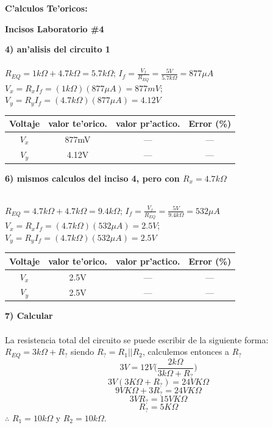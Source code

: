 \documentclass[11pt, letterpaper]{report}
\newenvironment{block}[1]{\hspace{-0.8 cm}\textbf{\Large #1}}{\vspace{3 mm}} %
\newenvironment{question}[2]{\hspace{-0.8 cm}\textbf{#1) #2\\\\}}{\vspace{3 mm}} %
\begin{document}
	
	\begin{block}{C'alculos Te'oricos:\\}
	
	
	{\large \bfseries{Incisos Laboratorio \#4\\}}
	
	\begin{question}{4}{an'alisis del circuito 1}
	\(R_{EQ}=1k\Omega+4.7k\Omega=5.7k\Omega\); \(I_f=\frac{V_f}{R_{EQ}}=\frac{5V}{5.7k\Omega}=877\mu A\)\\
	\(V_x=R_xI_f=(1k\Omega)(877\mu A)=877mV\); \(V_y=R_yI_f=(4.7k\Omega)(877\mu A)=4.12V\)
	
	\vspace{.5 cm}
	\begin{tabular}{cccc}
	\hline
	Voltaje & valor te'orico. & valor pr'actico. & Error (\%)\\
	\hline\hline
	\(V_x\) & 877mV & --- & ---\\
	\hline
	\(V_y\) & 4.12V & --- & ---\\
	\hline
	\end{tabular}

	\end{question}
	
	\begin{question}{6}{mismos calculos del inciso 4, pero con \(R_x = 4.7k\Omega\)}
	
	\(R_{EQ}=4.7k\Omega+4.7k\Omega=9.4k\Omega\); \(I_f=\frac{V_f}{R_{EQ}}=\frac{5V}{9.4k\Omega}=532\mu A\)\\
	\(V_x=R_xI_f=(4.7k\Omega)(532\mu A)=2.5V\); \(V_y=R_yI_f=(4.7k\Omega)(532\mu A)=2.5V\)
	
	\vspace{.5 cm}
	\begin{tabular}{cccc}
	\hline
	Voltaje & valor te'orico. & valor pr'actico. & Error (\%)\\
	\hline\hline
	\(V_x\) & 2.5V & --- & ---\\
	\hline
	\(V_y\) & 2.5V & --- & ---\\
	\hline
	\end{tabular}
	\end{question}
	
	\vspace{3 mm}
	\begin{question}{7}{Calcular}
	La resistencia total del circuito se puede escribir de la siguiente forma: \(R_{EQ}=3k\Omega+R_?\) siendo \(R_?=R_1||R_2\), calculemos entonces a \(R_?\)\\
	\[3V=12V\bigl( \frac{2k\Omega}{3k\Omega+R_?} \bigr)\] \[3V(3K\Omega + R_?)=24VK\Omega\] \[9VK\Omega +3R_?=24VK\Omega\] \[3VR_?=15VK\Omega\] \[R_?=5K\Omega\] \(\therefore\) \(R_1=10k\Omega\) y \(R_2=10k\Omega\).
	\end{question}
	

\end{block}
\end{document}
